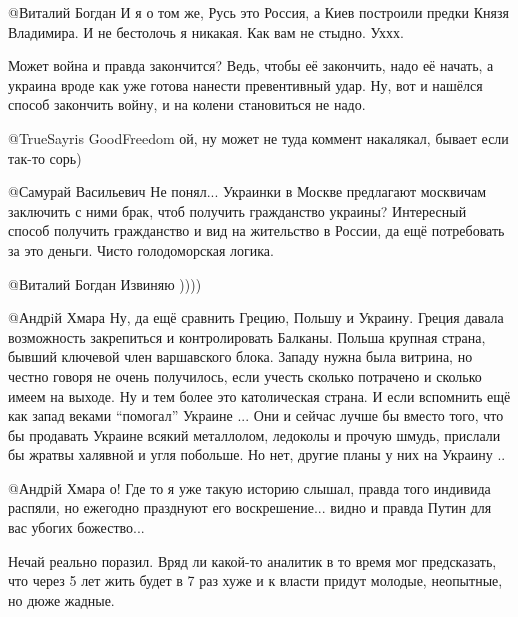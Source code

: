 \begin{itemize}
\begin{itemize}

@Виталий Богдан  И я о том же, Русь это Россия, а Киев построили предки Князя
Владимира. И не бестолочь я никакая. Как вам не стыдно. Уххх.


Может война и правда закончится? Ведь, чтобы её закончить, надо её начать, а
украина вроде как уже готова нанести превентивный удар. Ну, вот и нашёлся
способ закончить войну, и на колени становиться не надо.


@TrueSayris GoodFreedom  ой, ну может не туда коммент накалякал, бывает если
так-то сорь)


@Самурай Васильевич  Не понял... Украинки в Москве предлагают москвичам
заключить с ними брак, чтоб получить гражданство украины? Интересный способ
получить гражданство и вид на жительство в России, да ещё потребовать за это
деньги. Чисто голодоморская логика.


@Виталий Богдан  Извиняю ))))


@Андрiй Хмара  Ну, да ещё сравнить Грецию, Польшу и Украину. Греция давала
возможность закрепиться и контролировать Балканы. Польша крупная страна,
бывший ключевой член варшавского блока. Западу нужна была витрина, но честно
говоря не очень получилось, если учесть сколько потрачено и сколько имеем на
выходе. Ну и тем более это католическая страна. И если вспомнить ещё как
запад веками \enquote{помогал} Украине ... Они и сейчас лучше бы вместо того, что
бы продавать Украине всякий металлолом, ледоколы и прочую шмудь, прислали бы
жратвы халявной и угля побольше. Но нет, другие планы у них на Украину ..


@Андрiй Хмара  о! Где то я уже такую историю слышал, правда того индивида
распяли, но ежегодно празднуют его воскрешение... видно и правда Путин для вас
убогих божество...


\end{itemize} %


Нечай реально поразил. Вряд ли какой-то аналитик в то время мог предсказать,
что через 5 лет жить будет в 7 раз хуже и к власти придут молодые, неопытные,
но дюже жадные.


\end{itemize}
